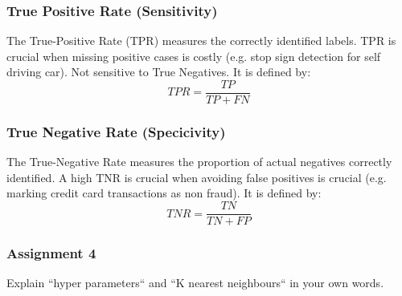 \documentclass[12pt]{article}
\begin{document}
\subsubsection{True Positive Rate (Sensitivity)}
The True-Positive Rate (TPR) measures the correctly identified labels. TPR is crucial when missing positive cases is costly (e.g. stop sign detection for self driving car). Not sensitive to True Negatives. It is defined by:
\[ TPR = \frac{TP}{TP+FN}\]

\subsubsection{True Negative Rate (Specicivity)}
The True-Negative Rate measures the proportion of actual negatives correctly identified. A high TNR is crucial when avoiding false positives is crucial (e.g. marking credit card transactions as non fraud). It is defined by: 
\[ TNR = \frac{TN}{TN+FP}\]

\subsubsection{Assignment 4}
Explain “hyper parameters“ and “K nearest neighbours“ in your own words.
\end{document}
